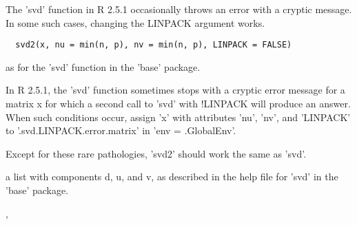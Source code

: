 \documentclass{article}
\begin{document}
\begin{Description}\relax
The 'svd' function in R 2.5.1 occasionally throws an error
with a cryptic message.  In some such cases, changing the
LINPACK argument works.
\end{Description}
\begin{Usage}
\begin{verbatim}
  svd2(x, nu = min(n, p), nv = min(n, p), LINPACK = FALSE)
\end{verbatim}
\end{Usage}
\begin{Arguments}
\begin{ldescription}
\item[\code{x, nu, nv, LINPACK}] as for the 'svd' function in the 'base' package.

\end{ldescription}
\end{Arguments}
\begin{Details}\relax
In R 2.5.1, the 'svd' function sometimes stops with a cryptic error
message for a matrix x for which a second call to 'svd' with !LINPACK
will produce an answer.  When such conditions occur, assign 'x' with
attributes 'nu', 'nv', and 'LINPACK' to '.svd.LINPACK.error.matrix'
in 'env = .GlobalEnv'.

Except for these rare pathologies, 'svd2' should work the same as
'svd'.
\end{Details}
\begin{Value}
a list with components d, u, and v, as described in the help file for
'svd' in the 'base' package.
\end{Value}
\begin{SeeAlso}\relax
{},
\end{SeeAlso}
\end{document}
